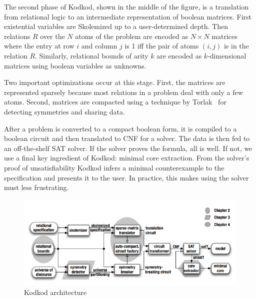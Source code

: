 The second phase of Kodkod, shown in the middle of the figure, is a translation
 from relational logic to an intermediate representation of boolean matrices.
First existential variables are Skolemized up to a user-determined depth.
Then relations $R$ over the $N$ atoms of the problem are encoded as $N \times N$
 matrices where the entry at row $i$ and column $j$ is 1 iff the pair of atoms
 $(i, j)$ is in the relation $R$.
Similarly, relational bounds of arity $k$ are encoded as $k$-dimensional matrices
 using boolean variables as unknowns.

Two important optimizations occur at this stage.
First, the matrices are represented sparsely because most relations in a problem
 deal with only a few atoms.
Second, matrices are compacted using a technique by Torlak~\cite{t-dissertation-2009}
 for detecting symmetries and sharing data.

After a problem is converted to a compact boolean form, it is compiled to a boolean
 circuit and then translated to CNF for a solver.
The data is then fed to an off-the-shelf SAT solver.
If the solver proves the formula, all is well.
If not, we use a final key ingredient of Kodkod: minimal core extraction.
From the solver's proof of unsatisfiability Kodkod infers a minimal counterexample
 to the specification and presents it to the user.
In practice, this makes using the solver must less frustrating.

\begin{figure}
  \begin{center}
  \includegraphics[width=12cm]{arch.png}
  \end{center}
  \caption{Kodkod architecture}
  \label{fig:arch}
\end{figure}


